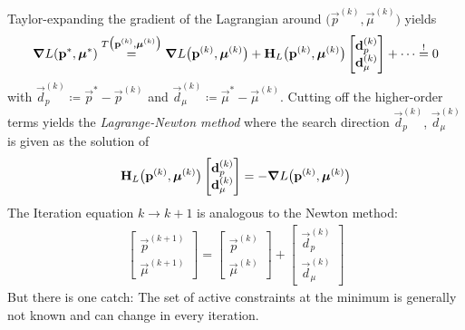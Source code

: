 		Taylor-expanding the gradient of the Lagrangian around \( \big( \vec{p}^{(k)}, \vec{\mu}^{(k)} \big) \) yields
		\begin{align*}
			\grad{L}(\boldsymbol{\mathrm{p}}^\ast, \boldsymbol{\mathrm{\mu}}^\ast) \overset{T\big(\boldsymbol{\mathrm{p}}^{(k)}, \boldsymbol{\mathrm{\mu}}^{(k)}\big)}{=} \grad{L}\big(\boldsymbol{\mathrm{p}}^{(k)}, \boldsymbol{\mathrm{\mu}}^{(k)}\big) + \boldsymbol{\mathrm{H}}_L\big(\boldsymbol{\mathrm{p}}^{(k)}, \boldsymbol{\mathrm{\mu}}^{(k)}\big) \begin{bmatrix} \boldsymbol{\mathrm{d}}_p^{(k)} \\ \boldsymbol{\mathrm{d}}_\mu^{(k)} \end{bmatrix} + \cdots \overset{!}{=} 0
		\end{align*}
		with \( \vec{d}_p^{(k)} \coloneqq \vec{p}^\ast - \vec{p}^{(k)} \) and \( \vec{d}_\mu^{(k)} \coloneqq \vec{\mu}^\ast - \vec{\mu}^{(k)} \). Cutting off the higher-order terms yields the \emph{Lagrange-Newton method} where the search direction \( \vec{d}_p^{(k)} \), \( \vec{d}_\mu^{(k)} \) is given as the solution of
		\begin{align*}
			\boldsymbol{\mathrm{H}}_L\big(\boldsymbol{\mathrm{p}}^{(k)}, \boldsymbol{\mathrm{\mu}}^{(k)}\big) \begin{bmatrix} \boldsymbol{\mathrm{d}}_p^{(k)} \\ \boldsymbol{\mathrm{d}}_\mu^{(k)} \end{bmatrix} = -\grad{L}\big(\boldsymbol{\mathrm{p}}^{(k)}, \boldsymbol{\mathrm{\mu}}^{(k)}\big)
		\end{align*}
		The Iteration equation \( k \to k + 1 \) is analogous to the Newton method:
		\begin{align}
			\begin{bmatrix}
				\vec{p}^{(k + 1)} \\
				\vec{\mu}^{(k + 1)}
			\end{bmatrix}
			=
			\begin{bmatrix}
				\vec{p}^{(k)} \\
				\vec{\mu}^{(k)}
			\end{bmatrix}
			+
			\begin{bmatrix}
				\vec{d}_p^{(k)} \\
				\vec{d}_\mu^{(k)}
			\end{bmatrix}
			\label{eq:sqpEqSystem}
		\end{align}
		But there is one catch: The set of active constraints at the minimum is generally not known and can change in every iteration.

